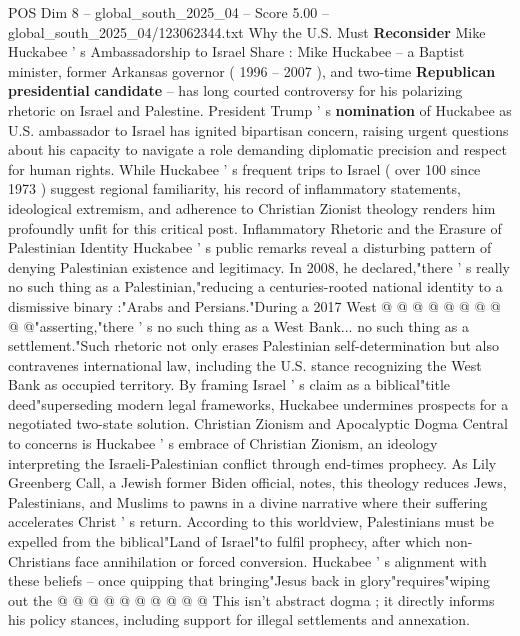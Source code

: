 \begin{textsample}{POS Dim 8 – global\_south\_2025\_04 – Score 5.00 – global\_south\_2025\_04/123062344.txt}  \label{ex:f8_pos_411}
Why the U.S.
Must \textbf{Reconsider} Mike Huckabee ' s Ambassadorship to Israel Share : Mike Huckabee -- a Baptist minister, former Arkansas governor ( 1996 -- 2007 ), and two-time \textbf{Republican} \textbf{presidential} \textbf{candidate} -- has long courted controversy for his polarizing rhetoric on Israel and Palestine.
President Trump ' s \textbf{nomination} of Huckabee as U.S. ambassador to Israel has ignited bipartisan concern, raising urgent questions about his capacity to navigate a role demanding diplomatic precision and respect for human rights.
While Huckabee ' s frequent trips to Israel ( over 100 since 1973 ) suggest regional familiarity, his record of inflammatory statements, ideological extremism, and adherence to Christian Zionist theology renders him profoundly unfit for this critical post.
Inflammatory Rhetoric and the Erasure of Palestinian Identity Huckabee ' s public remarks reveal a disturbing pattern of denying Palestinian existence and legitimacy.
In 2008, he declared,"there ' s really no such thing as a Palestinian,"reducing a centuries-rooted national identity to a dismissive binary :"Arabs and Persians."During a 2017 West @ @ @ @ @ @ @ @ @ @"asserting,"there ' s no such thing as a West Bank... no such thing as a settlement."Such rhetoric not only erases Palestinian self-determination but also contravenes international law, including the U.S. stance recognizing the West Bank as occupied territory.
By framing Israel ' s claim as a biblical"title deed"superseding modern legal frameworks, Huckabee undermines prospects for a negotiated two-state solution.
Christian Zionism and Apocalyptic Dogma Central to concerns is Huckabee ' s embrace of Christian Zionism, an ideology interpreting the Israeli-Palestinian conflict through end-times prophecy.
As Lily Greenberg Call, a Jewish former Biden official, notes, this theology reduces Jews, Palestinians, and Muslims to pawns in a divine narrative where their suffering accelerates Christ ' s return.
According to this worldview, Palestinians must be expelled from the biblical"Land of Israel"to fulfil prophecy, after which non-Christians face annihilation or forced conversion.
Huckabee ' s alignment with these beliefs -- once quipping that bringing"Jesus back in glory"requires"wiping out the @ @ @ @ @ @ @ @ @ @ This isn't abstract dogma ; it directly informs his policy stances, including support for illegal settlements and annexation.

\end{textsample}
